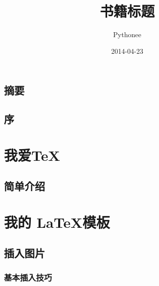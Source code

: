 \documentclass[fancyhdr,adobefonts,oneside,hyperref,openany,a4paper,UTF8]{ctexbook}
\author{Pythonee}
\title{书籍标题}
\date{2014-04-23}
\begin{document}
\maketitle


\frontmatter
\tableofcontents
\listoftables
\listoffigures
\lstlistoflistings
\setcounter{page}{0}
\chapter{摘要}
\lipsum[1]
\chapter{序}
\lipsum[1]


\mainmatter
\part{我爱\TeX}
\chapter{简单介绍}
\lipsum

\part{我的 \LaTeX 模板}
\chapter{插入图片}
\section{基本插入技巧}
\end{document}
